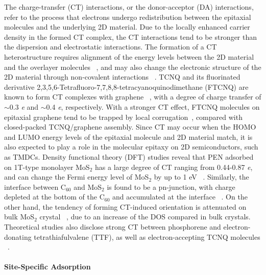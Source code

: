 The charge-transfer (CT) interactions, or the donor-acceptor (DA)
interactions, refer to the process that electrons undergo
redistribution between the epitaxial molecules and the underlying 2D
material. Due to the locally enhanced carrier density in the formed CT
complex, the CT interactions tend to be stronger than the dispersion
and electrostatic interactions. The formation of a CT heterostructure
requires alignment of the energy levels between the 2D material and
the overlayer molecules ~\cite{Akiyoshi_2015_DA}, and may also change
the electronic structure of the 2D material through non-covalent
interactions
~\cite{Cai_2015_doping_2D_rev,Wehling_2008_doping,Zhang_2011_rev_pipi_gr}.
TCNQ and its fluorinated derivative
2,3,5,6-Tetra\-fluoro-7,7,8,8-tetra\-cyanoquino\-dimethane (FTCNQ) are
known to form CT complexes with graphene
~\cite{Chen_2007_TCNQ_gr,Voggu_2008_TCNQ,Barja_2010_TCNQ_gr}, with a
degree of charge transfer of $\sim{}$0.3 \textit{e} and $\sim{}$0.4
\textit{e}, respectively. With a stronger CT effect, FTCNQ molecules
on epitaxial graphene tend to be trapped by local
corrugation~\cite{Barja_2010_TCNQ_gr}, compared with closed-packed
TCNQ/graphene assembly.  Since CT may occur when the HOMO and LUMO
energy levels of the epitaxial molecule and 2D material match, it is
also expected to play a role in the molecular epitaxy on 2D
semiconductors, such as TMDCs. Density functional theory (DFT) studies
reveal that PEN adsorbed on 1T-type monolayer MoS\(_{\text{2}}\) has a
large degree of CT ranging from 0.44-0.87 \emph{e}, and can change the
Fermi energy level of MoS\(_{\text{2}}\) by up to 1 eV
~\cite{Shen_2017_DFT_mos2_pent}. Similarly, the interface between
C\(_{\text{60}}\) and MoS\(_{\text{2}}\) is found to be a pn-junction,
with charge depleted at the bottom of the C\(_{\text{60}}\) and
accumulated at the interface ~\cite{Chen_2016_c60_mos2}. On the other
hand, the tendency of forming CT-induced orientation is attenuated on
bulk MoS\(_{\text{2}}\) crystal ~\cite{Sakurai_1991_c60_mos2}, due to
an increase of the DOS compared in bulk crystals. Theoretical studies
also disclose strong CT between phosphorene and electron-donating
tetrathiafulvalene (TTF), as well as electron-accepting TCNQ molecules
~\cite{Zhang_2015_DA_phosphorene}.


\paragraph{Site-Specific Adsorption}
\label{sec:org87b0c12}

